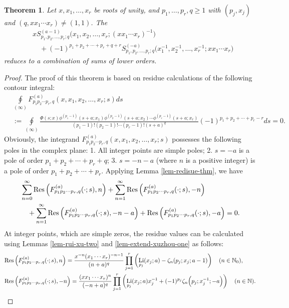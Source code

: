 \documentclass[11pt]{article}
\newcommand\Res{{\rm Res}}
\DeclareMathOperator{\Li}{Li}
\def\N{\mathbb{N}}
\theoremstyle{plain}
\newtheorem{thm}{Theorem}[section]
\theoremstyle{definition}
\begin{document}
\begin{thm}\label{thm-parityc-CES-one} Let $x,x_1,\ldots,x_r$ be roots of unity, and $p_1,\ldots,p_r,q\geq 1$ with $(p_j,x_j) $ and $ (q,xx_1\cdots x_r)\neq (1,1)$. The
\begin{align*}
&x S_{p_1,p_2,\ldots,p_r;q}^{(a-1)}\Big(x_1,x_2,\ldots,x_r;(xx_1\cdots x_r)^{-1}\Big)\\&\quad+(-1)^{p_1+p_2+\cdots+p_r+q+r}S_{p_1,p_2,\ldots,p_r;q}^{(-a)}\Big(x_1^{-1},x_2^{-1},\ldots,x_r^{-1};xx_1\cdots x_r\Big)
\end{align*}
reduces to a combination of sums of lower orders.
\end{thm}
\begin{proof}
The proof of this theorem is based on residue calculations of the following contour integral:
\begin{align*}
&\oint\limits_{\left( \infty  \right)}F^{(a)}_{p_1p_2\cdots p_r,q}(x,x_1,x_2,\ldots,x_r;s)ds\\
&:= \oint\limits_{\left( \infty  \right)}\frac{\Phi(s;x)\phi^{(p_1-1)}(s+a;x_1)\phi^{(p_2-1)}(s+a;x_2)\cdots\phi^{(p_r-1)}(s+a;x_r)}{(p_1-1)!(p_2-1)!\cdots (p_r-1)!(s+a)^q} (-1)^{p_1+p_2+\cdots+p_r-r}ds=0.
\end{align*}
Obviously, the integrand $F^{(a)}_{p_1p_2\cdots p_r,q}(x,x_1,x_2,\ldots,x_r;s)$ possesses the following poles in the complex plane: 1. All integer points are simple poles; 2. $s=-a$ is a pole of order $p_1+p_2+\cdots+p_r+q$; 3. $s=-n-a$ (where $n$ is a positive integer) is a pole of order $p_1+p_2+\cdots+p_r$. Applying Lemma \ref{lem-redisue-thm}, we have
\begin{align}\label{residue-sums-quad}
&\sum_{n=0}^\infty \Res\left(F^{(a)}_{p_1p_2\cdots p_r,q}(\cdot;s),n\right)+\sum_{n=1}^\infty \Res\left(F^{(a)}_{p_1p_2\cdots p_r,q}(\cdot;s),-n\right)\nonumber\\&\quad+\sum_{n=1}^\infty\Res\left(F^{(a)}_{p_1p_2\cdots p_r,q}(\cdot;s),-n-a\right)+\Res\left(F^{(a)}_{p_1p_2\cdots p_r,q}(\cdot;s),-a\right)=0.
\end{align}
At integer points, which are simple zeros, the residue values can be calculated using Lemmas \ref{lem-rui-xu-two} and \ref{lem-extend-xuzhou-one} as follows:
\begin{align*}
&\Res\left(F^{(a)}_{p_1p_2\cdots p_r,q}(\cdot;s),n\right)=\frac{x^{-n}(x_1\cdots x_r)^{-n-1}}{(n+a)^q}\prod\limits_{j=1}^r\left(\Li_{p_j}(x_j;a)-\zeta_n(p_j;x_j;a-1)\right)\quad (n\in \N_0),\\
&\Res\left(F^{(a)}_{p_1p_2\cdots p_r,q}(\cdot;s),-n\right)=\frac{(xx_1\cdots x_r)^n}{(-n+a)^q}\prod\limits_{j=1}^r\left(\Li_{p_j}(x_j;a)x_j^{-1}+(-1)^{p_j}\zeta_n\Big(p_j;x_j^{-1};-a\Big)\right)\quad (n\in \N).

\end{align*}
\end{proof}
\end{document}
